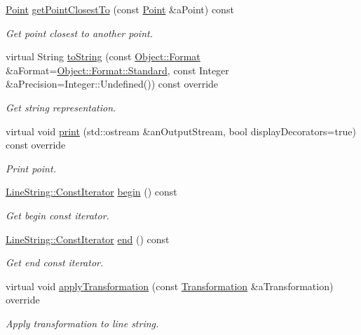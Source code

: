 \begin{DoxyCompactItemize}
\hyperlink{classostk_1_1math_1_1geom_1_1d2_1_1objects_1_1_point}{Point} \hyperlink{classostk_1_1math_1_1geom_1_1d2_1_1objects_1_1_line_string_adba8e8498cade7e10b4df301b0215d8e}{get\+Point\+Closest\+To} (const \hyperlink{classostk_1_1math_1_1geom_1_1d2_1_1objects_1_1_point}{Point} \&a\+Point) const
\begin{DoxyCompactList}\small\item\em Get point closest to another point. \end{DoxyCompactList}\item 
virtual String \hyperlink{classostk_1_1math_1_1geom_1_1d2_1_1objects_1_1_line_string_a5312030bced48de68f8902bb6581461d}{to\+String} (const \hyperlink{classostk_1_1math_1_1geom_1_1d2_1_1_object_aa76f9e30caebf4005bafbdff447f66cf}{Object\+::\+Format} \&a\+Format=\hyperlink{classostk_1_1math_1_1geom_1_1d2_1_1_object_aa76f9e30caebf4005bafbdff447f66cfaeb6d8ae6f20283755b339c0dc273988b}{Object\+::\+Format\+::\+Standard}, const Integer \&a\+Precision=Integer\+::\+Undefined()) const override
\begin{DoxyCompactList}\small\item\em Get string representation. \end{DoxyCompactList}\item 
virtual void \hyperlink{classostk_1_1math_1_1geom_1_1d2_1_1objects_1_1_line_string_afcdaa3f11f0bd830af0311392c7e9e26}{print} (std\+::ostream \&an\+Output\+Stream, bool display\+Decorators=true) const override
\begin{DoxyCompactList}\small\item\em Print point. \end{DoxyCompactList}\item 
\hyperlink{classostk_1_1math_1_1geom_1_1d2_1_1objects_1_1_line_string_a29e6326c716bef2ec438534cfdc1e118}{Line\+String\+::\+Const\+Iterator} \hyperlink{classostk_1_1math_1_1geom_1_1d2_1_1objects_1_1_line_string_a67bd071017fdd15e96b8930d4e16aacd}{begin} () const
\begin{DoxyCompactList}\small\item\em Get begin const iterator. \end{DoxyCompactList}\item 
\hyperlink{classostk_1_1math_1_1geom_1_1d2_1_1objects_1_1_line_string_a29e6326c716bef2ec438534cfdc1e118}{Line\+String\+::\+Const\+Iterator} \hyperlink{classostk_1_1math_1_1geom_1_1d2_1_1objects_1_1_line_string_ac8336b4c3418337eb1b04f6eb7e11927}{end} () const
\begin{DoxyCompactList}\small\item\em Get end const iterator. \end{DoxyCompactList}\item 
virtual void \hyperlink{classostk_1_1math_1_1geom_1_1d2_1_1objects_1_1_line_string_afd26337c26696a0ff1b4b2e94e58f17c}{apply\+Transformation} (const \hyperlink{classostk_1_1math_1_1geom_1_1d2_1_1_transformation}{Transformation} \&a\+Transformation) override
\begin{DoxyCompactList}\small\item\em Apply transformation to line string. \end{DoxyCompactList}\end{DoxyCompactItemize}
